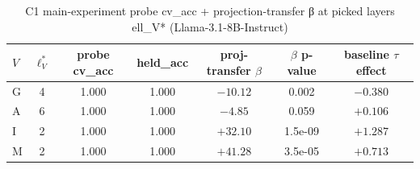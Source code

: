 \begin{table}[t]
\centering
\caption{C1 main-experiment probe cv\_acc + projection-transfer β at picked layers ell\_V* (Llama-3.1-8B-Instruct)}
\label{tab:c1_probe_transfer_stats}
\begin{tabular}{lcccccc}
\toprule
$V$ & $\ell_V^*$ & probe cv\_acc & held\_acc & proj-transfer $\beta$ & $\beta$ p-value & baseline $\tau$ effect \\
\midrule
G & 4 & 1.000 & 1.000 & $-10.12$ & 0.002 & $-0.380$ \\
A & 6 & 1.000 & 1.000 & $-4.85$ & 0.059 & $+0.106$ \\
I & 2 & 1.000 & 1.000 & $+32.10$ & 1.5e-09 & $+1.287$ \\
M & 2 & 1.000 & 1.000 & $+41.28$ & 3.5e-05 & $+0.713$ \\
\bottomrule
\end{tabular}
\end{table}
